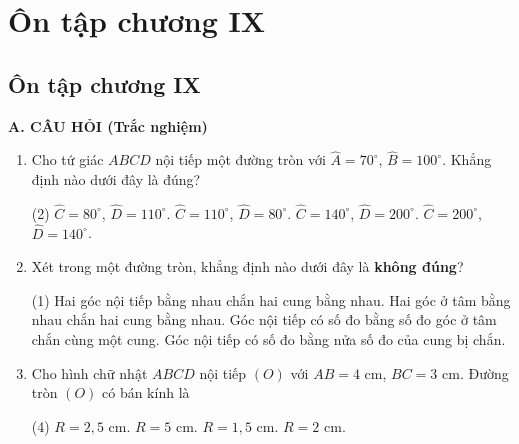 \section*{Ôn tập chương IX}

\begin{practice}
    \subsection{Ôn tập chương IX}

    \textbf{A. CÂU HỎI (Trắc nghiệm)}

    \begin{enumerate}
        \item Cho tứ giác $ABCD$ nội tiếp một đường tròn với $\widehat{A}=70^\circ$, $\widehat{B}=100^\circ$. Khẳng định nào dưới đây là đúng?
        \begin{tasks}(2)
            \task $\widehat{C}=80^\circ$, $\widehat{D}=110^\circ$.
            \task $\widehat{C}=110^\circ$, $\widehat{D}=80^\circ$.
            \task $\widehat{C}=140^\circ$, $\widehat{D}=200^\circ$.
            \task $\widehat{C}=200^\circ$, $\widehat{D}=140^\circ$.
        \end{tasks}
        \par\noindent\answerbox\par

        \item Xét trong một đường tròn, khẳng định nào dưới đây là \textbf{không đúng}?
        \begin{tasks}(1)
            \task Hai góc nội tiếp bằng nhau chắn hai cung bằng nhau.
            \task Hai góc ở tâm bằng nhau chắn hai cung bằng nhau.
            \task Góc nội tiếp có số đo bằng số đo góc ở tâm chắn cùng một cung.
            \task Góc nội tiếp có số đo bằng nửa số đo của cung bị chắn.
        \end{tasks}
        \par\noindent\answerbox\par

        \item Cho hình chữ nhật $ABCD$ nội tiếp $(O)$ với $AB=4$ cm, $BC=3$ cm. Đường tròn $(O)$ có bán kính là
        \begin{tasks}(4)
            \task $R=2{,}5$ cm.
            \task $R=5$ cm.
            \task $R=1{,}5$ cm.
            \task $R=2$ cm.
        \end{tasks}
        \par\noindent\answerbox\par
    \end{enumerate}


\end{practice}
